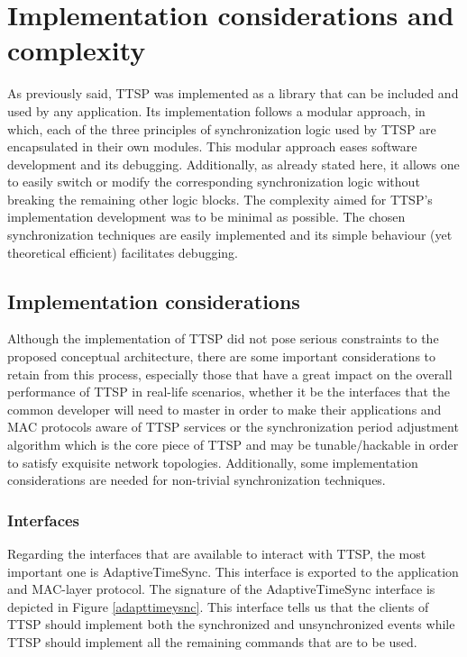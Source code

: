\section{Implementation considerations and complexity}
As previously said, TTSP was implemented as a library that can be included and used by any application. Its implementation follows a modular approach, in which, each of the three principles of synchronization logic used by TTSP are encapsulated in their own modules. This modular approach eases software development and its debugging. Additionally, as already stated here, it allows one to easily switch or modify the corresponding synchronization logic without breaking the remaining other logic blocks. The complexity aimed for TTSP's implementation development was to be minimal as possible. The chosen synchronization techniques are easily implemented and its simple behaviour (yet theoretical efficient) facilitates debugging.

\subsection{Implementation considerations}
Although the implementation of TTSP did not pose serious constraints to the proposed conceptual architecture, there are some important considerations to retain from this process, especially those that have a great impact on the overall performance of TTSP in real-life scenarios, whether it be the interfaces that the common developer will need to master in order to make their applications and MAC protocols aware of TTSP services or the synchronization period adjustment algorithm which is the core piece of TTSP and may be tunable/hackable in order to satisfy exquisite network topologies. Additionally, some implementation considerations are needed for non-trivial synchronization techniques.

\subsubsection{Interfaces}
Regarding the interfaces that are available to interact with TTSP, the most important one is AdaptiveTimeSync. This interface is exported to the application and MAC-layer protocol. The signature of the AdaptiveTimeSync interface is depicted in Figure \ref{adapttimeysnc}. This interface tells us that the clients of TTSP should implement both the synchronized and unsynchronized events while TTSP should implement all the remaining commands that are to be used.

